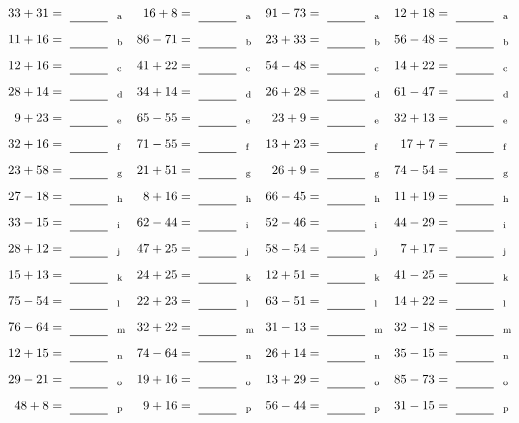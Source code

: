 \documentclass
[
  draft    = true,
  fontsize = 11pt,
  parskip  = half-
]
{scrartcl}
\begin{document}
\clearpage
\begin{align*}
    \pline{33+31}&=\rline{a}
  & \pline{16+8}&=\rline{a}
  & \pline{91-73}&=\rline{a}
  & \pline{12+18}&=\rline{a} \\[1ex]
    \pline{11+16}&=\rline{b}
  & \pline{86-71}&=\rline{b}
  & \pline{23+33}&=\rline{b}
  & \pline{56-48}&=\rline{b} \\[1ex]
    \pline{12+16}&=\rline{c}
  & \pline{41+22}&=\rline{c}
  & \pline{54-48}&=\rline{c}
  & \pline{14+22}&=\rline{c} \\[1ex]
    \pline{28+14}&=\rline{d}
  & \pline{34+14}&=\rline{d}
  & \pline{26+28}&=\rline{d}
  & \pline{61-47}&=\rline{d} \\[1ex]
    \pline{9+23}&=\rline{e}
  & \pline{65-55}&=\rline{e}
  & \pline{23+9}&=\rline{e}
  & \pline{32+13}&=\rline{e} \\[1ex]
    \pline{32+16}&=\rline{f}
  & \pline{71-55}&=\rline{f}
  & \pline{13+23}&=\rline{f}
  & \pline{17+7}&=\rline{f} \\[1ex]
    \pline{23+58}&=\rline{g}
  & \pline{21+51}&=\rline{g}
  & \pline{26+9}&=\rline{g}
  & \pline{74-54}&=\rline{g} \\[1ex]
    \pline{27-18}&=\rline{h}
  & \pline{8+16}&=\rline{h}
  & \pline{66-45}&=\rline{h}
  & \pline{11+19}&=\rline{h} \\[1ex]
    \pline{33-15}&=\rline{i}
  & \pline{62-44}&=\rline{i}
  & \pline{52-46}&=\rline{i}
  & \pline{44-29}&=\rline{i} \\[1ex]
    \pline{28+12}&=\rline{j}
  & \pline{47+25}&=\rline{j}
  & \pline{58-54}&=\rline{j}
  & \pline{7+17}&=\rline{j} \\[1ex]
    \pline{15+13}&=\rline{k}
  & \pline{24+25}&=\rline{k}
  & \pline{12+51}&=\rline{k}
  & \pline{41-25}&=\rline{k} \\[1ex]
    \pline{75-54}&=\rline{l}
  & \pline{22+23}&=\rline{l}
  & \pline{63-51}&=\rline{l}
  & \pline{14+22}&=\rline{l} \\[1ex]
    \pline{76-64}&=\rline{m}
  & \pline{32+22}&=\rline{m}
  & \pline{31-13}&=\rline{m}
  & \pline{32-18}&=\rline{m} \\[1ex]
    \pline{12+15}&=\rline{n}
  & \pline{74-64}&=\rline{n}
  & \pline{26+14}&=\rline{n}
  & \pline{35-15}&=\rline{n} \\[1ex]
    \pline{29-21}&=\rline{o}
  & \pline{19+16}&=\rline{o}
  & \pline{13+29}&=\rline{o}
  & \pline{85-73}&=\rline{o} \\[1ex]
    \pline{48+8}&=\rline{p}
  & \pline{9+16}&=\rline{p}
  & \pline{56-44}&=\rline{p}
  & \pline{31-15}&=\rline{p}
\end{align*}
\end{document}
